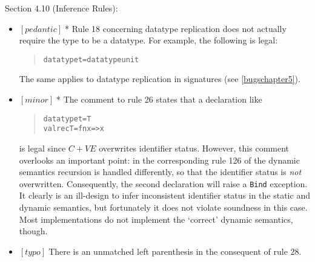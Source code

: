 \documentclass{article}
\newcommand{\m}[1]{$[\mathit{#1}]\;$}
\newcommand{\minor}{\m{minor}}
\newcommand{\pedantic}{\m{pedantic}}
\newcommand{\typo}{\m{typo}}
\newcommand{\void}[1]{}
\begin{document}
Section 4.10 (Inference Rules):
\nopagebreak

\begin{itemize}
\item \pedantic * Rule 18 concerning datatype replication does not actually require the type to be a datatype. For example, the following is legal:
\begin{quote}
\begin{alltt}
datatype t = datatype unit
\end{alltt}
\end{quote}
The same applies to datatype replication in signatures (see \ref{bugschapter5}).

\item \minor * The comment to rule 26 states that a declaration like
\begin{quote}
\begin{alltt}
datatype t = T
val rec T = fn x => x
\end{alltt}
\end{quote}
is legal since $C+\mathit{VE}$ overwrites identifier status. However, this comment overlooks an important point: in the corresponding rule 126 of the dynamic semantics recursion is handled differently, so that the identifier status is {\em not} overwritten. Consequently, the second declaration will raise a {\tt Bind} exception. It clearly is an ill-design to infer inconsistent identifier status in the static and dynamic semantics, but fortunately it does not violate soundness in this case. Most implementations do not implement the `correct' dynamic semantics, though.

\item \typo There is an unmatched left parenthesis in the consequent of rule 28.

\void{
\item \pedantic As an artefact of the treatment of type name generativity in the inference rules, the following expression is ill-typed according to the Definition \cite{mistakes}:
\begin{quote}
\begin{alltt}
let
    val r = ref NONE
    datatype t = C
in
    r := SOME C
end
\end{alltt}
\end{quote}
This behaviour is very tedious to implement and there is no real argument for forbidding such examples. Consequently, all SML implementation seem to allow it. Fixing this in favour of a more ``natural'' implementation of generativity would require getting rid of $\oplus$ composition and infer type name sets explicitly.
}
\end{itemize}
\end{document}
